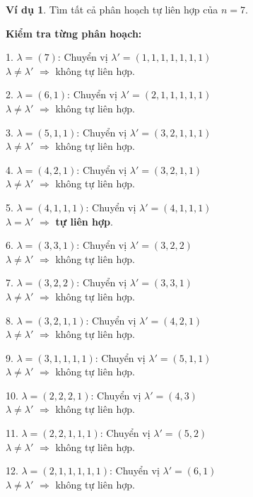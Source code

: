 \documentclass[12pt,a4paper]{article}
\theoremstyle{definition}
\newtheorem{example}{Ví dụ}
\begin{document}
\begin{example}
Tìm tất cả phân hoạch tự liên hợp của $n = 7$.

\textbf{Kiểm tra từng phân hoạch:}

1. $\lambda = (7)$: Chuyển vị $\lambda' = (1,1,1,1,1,1,1)$ \\
   $\lambda \neq \lambda'$ $\Rightarrow$ không tự liên hợp.

2. $\lambda = (6,1)$: Chuyển vị $\lambda' = (2,1,1,1,1,1)$ \\
   $\lambda \neq \lambda'$ $\Rightarrow$ không tự liên hợp.

3. $\lambda = (5,1,1)$: Chuyển vị $\lambda' = (3,2,1,1,1)$ \\
   $\lambda \neq \lambda'$ $\Rightarrow$ không tự liên hợp.

4. $\lambda = (4,2,1)$: Chuyển vị $\lambda' = (3,2,1,1)$ \\
   $\lambda \neq \lambda'$ $\Rightarrow$ không tự liên hợp.

5. $\lambda = (4,1,1,1)$: Chuyển vị $\lambda' = (4,1,1,1)$ \\
   $\lambda = \lambda'$ $\Rightarrow$ \textbf{tự liên hợp}.

6. $\lambda = (3,3,1)$: Chuyển vị $\lambda' = (3,2,2)$ \\
   $\lambda \neq \lambda'$ $\Rightarrow$ không tự liên hợp.

7. $\lambda = (3,2,2)$: Chuyển vị $\lambda' = (3,3,1)$ \\
   $\lambda \neq \lambda'$ $\Rightarrow$ không tự liên hợp.

8. $\lambda = (3,2,1,1)$: Chuyển vị $\lambda' = (4,2,1)$ \\
   $\lambda \neq \lambda'$ $\Rightarrow$ không tự liên hợp.

9. $\lambda = (3,1,1,1,1)$: Chuyển vị $\lambda' = (5,1,1)$ \\
   $\lambda \neq \lambda'$ $\Rightarrow$ không tự liên hợp.

10. $\lambda = (2,2,2,1)$: Chuyển vị $\lambda' = (4,3)$ \\
    $\lambda \neq \lambda'$ $\Rightarrow$ không tự liên hợp.

11. $\lambda = (2,2,1,1,1)$: Chuyển vị $\lambda' = (5,2)$ \\
    $\lambda \neq \lambda'$ $\Rightarrow$ không tự liên hợp.

12. $\lambda = (2,1,1,1,1,1)$: Chuyển vị $\lambda' = (6,1)$ \\
    $\lambda \neq \lambda'$ $\Rightarrow$ không tự liên hợp.


\end{example}
\end{document}
